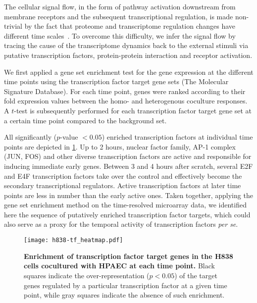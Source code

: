The cellular signal flow, in the form of pathway activation
downstream from membrane receptors and the subsequent 
transcriptional 
regulation, is made non-trivial by the fact that proteome 
and transcriptome regulation changes have different time scales~\citep{Busch2008}. 
To overcome this difficulty, we infer the signal flow by 
tracing the cause of the transcriptome dynamics back to the external stimuli via putative transcription factors, protein-protein interaction
and receptor activation. 

We first applied a gene set enrichment test for the gene expression at 
the different time points using the transcription factor target gene sets (The Molecular Signature Database).
For each time point, 
genes were ranked according to their fold expression values
between the homo- and heterogenous coculture responses. 
A $t$-test is subsequently performed for each
transcription factor target gene set at a certain time 
point compared to the 
background set.

All significantly ($p$-value $<0.05$) enriched 
transcription factors at individual time points are 
depicted in \ref{fig:h838_tf}. Up to 2 hours, nuclear
factor family, AP-1 complex (JUN, FOS) and other diverse
transcription factors are active and responsible for 
inducing immediate early genes. Between 3 and 4 hours after
scratch, several E2F and E4F transcription factors take
over the control and effectively become the secondary 
transcriptional regulators. Active transcription factors
at later time points are less in number than the early 
active ones.
Taken together, applying the gene set
enrichment method on the time-resolved microarray data, we identified here the
sequence of putatively enriched transcription factor targets, which could also serve as
a proxy for the temporal activity of transcription factors \emph{per se}.

\begin{figure}[!ht]
\begin{center}
\texttt{[image: h838-tf\_heatmap.pdf]}
\end{center}
\caption[Enrichment of transcription factors]{
{\bf Enrichment of transcription factor target genes in
the H838 cells cocultured with HPAEC at each time point.} 
Black squares indicate the over-representation ($p<0.05$) of the  
target genes regulated by a particular transcription factor
at a given time point, while gray squares indicate the
absence of such enrichment.
}
\label{fig:h838_tf}
\end{figure}

